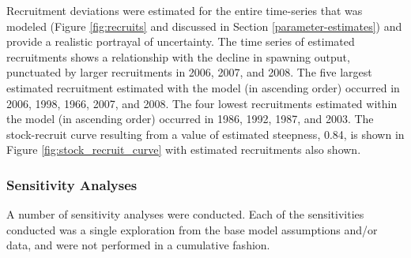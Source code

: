 \documentclass[12pt,]{article}
\begin{document}
Recruitment deviations were estimated for the entire time-series that
was modeled (Figure \ref{fig:recruits} and discussed in Section
\ref{parameter-estimates}) and provide a realistic portrayal of
uncertainty. The time series of estimated recruitments shows a
relationship with the decline in spawning output, punctuated by larger
recruitments in 2006, 2007, and 2008. The five largest estimated
recruitment estimated with the model (in ascending order) occurred in
2006, 1998, 1966, 2007, and 2008. The four lowest recruitments estimated
within the model (in ascending order) occurred in 1986, 1992, 1987, and
2003. The stock-recruit curve resulting from a value of estimated
steepness, 0.84, is shown in Figure \ref{fig:stock_recruit_curve} with
estimated recruitments also shown.

\subsubsection{Sensitivity Analyses}\label{sensitivity-analyses}

A number of sensitivity analyses were conducted. Each of the
sensitivities conducted was a single exploration from the base model
assumptions and/or data, and were not performed in a cumulative fashion.
\end{document}
